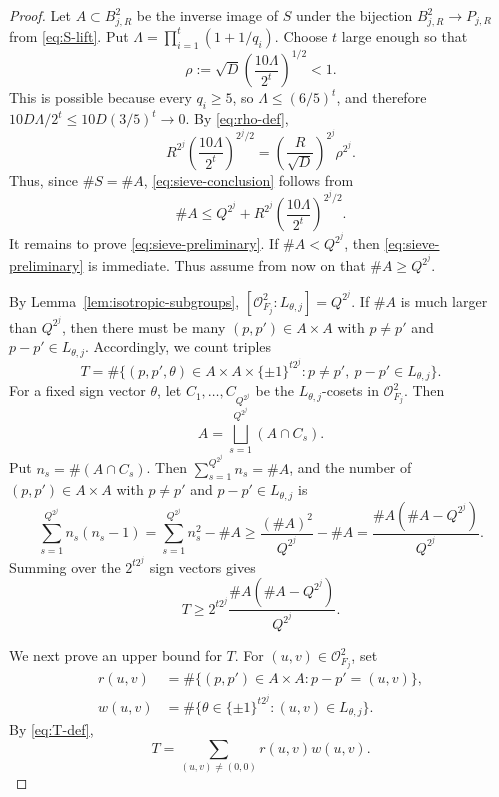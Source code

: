 \begin{proof}
Let \(A\subset B_{j,R}^2\) be the inverse image of \(S\) under the bijection \(B_{j,R}^2\to P_{j,R}\) from \eqref{eq:S-lift}.
Put \(\Lambda=\prod_{i=1}^t(1+1/q_i)\).
Choose \(t\) large enough so that
\begin{equation}\label{eq:rho-def}
\rho:=
\sqrt D\left(\frac{10\Lambda}{2^t}\right)^{1/2}
<1.
\end{equation}
This is possible because every \(q_i\ge5\), so \(\Lambda\le(6/5)^t\), and therefore \(10D\Lambda/2^t\le 10D(3/5)^t\to0\).
By \eqref{eq:rho-def},
\[
R^{2^j}\left(\frac{10\Lambda}{2^t}\right)^{2^j/2}
=
\left(\frac{R}{\sqrt D}\right)^{2^j}\rho^{2^j}.
\]
Thus, since \(\#S=\#A\), \eqref{eq:sieve-conclusion} follows from
\begin{equation}\label{eq:sieve-preliminary}
\#A\le Q^{2^j}+R^{2^j}\left(\frac{10\Lambda}{2^t}\right)^{2^j/2}.
\end{equation}
It remains to prove \eqref{eq:sieve-preliminary}.
If \(\#A<Q^{2^j}\), then \eqref{eq:sieve-preliminary} is immediate.
Thus assume from now on that \(\#A\ge Q^{2^j}\).

By Lemma~\ref{lem:isotropic-subgroups}, \([\mathcal O_{F_j}^2:L_{\theta,j}]=Q^{2^j}\).
If \(\#A\) is much larger than \(Q^{2^j}\), then there must be many \((p,p')\in A\times A\) with \(p\ne p'\) and \(p-p'\in L_{\theta,j}\).
Accordingly, we count triples
\begin{equation}\label{eq:T-def}
T=
\#\{(p,p',\theta)\in A\times A\times\{\pm1\}^{t2^j}:
p\ne p',\ p-p'\in L_{\theta,j}\}.
\end{equation}
For a fixed sign vector \(\theta\), let \(C_1,\ldots,C_{Q^{2^j}}\) be the \(L_{\theta,j}\)-cosets in \(\mathcal O_{F_j}^2\).
Then
\[
A=\bigsqcup_{s=1}^{Q^{2^j}} (A\cap C_s).
\]
Put \(n_s=\#(A\cap C_s)\).
Then \(\sum_{s=1}^{Q^{2^j}} n_s=\#A\), and the number of \((p,p')\in A\times A\) with \(p\ne p'\) and \(p-p'\in L_{\theta,j}\) is
\[
\sum_{s=1}^{Q^{2^j}} n_s(n_s-1)
=
\sum_{s=1}^{Q^{2^j}} n_s^2-\#A
\ge
\frac{(\#A)^2}{Q^{2^j}}-\#A
=
\frac{\#A(\#A-Q^{2^j})}{Q^{2^j}}.
\]
Summing over the \(2^{t2^j}\) sign vectors gives
\begin{equation}\label{eq:T-lower}
T\ge
2^{t2^j}\frac{\#A(\#A-Q^{2^j})}{Q^{2^j}}.
\end{equation}

We next prove an upper bound for \(T\).
For \((u,v)\in\mathcal O_{F_j}^2\), set
\begin{align*}
r(u,v)&=\#\{(p,p')\in A\times A:p-p'=(u,v)\},\\
w(u,v)&=\#\{\theta\in\{\pm1\}^{t2^j}:(u,v)\in L_{\theta,j}\}.
\end{align*}
By \eqref{eq:T-def},
\begin{equation}\label{eq:T-rw}
T=\sum_{(u,v)\ne(0,0)} r(u,v)w(u,v).
\end{equation}


\end{proof}
